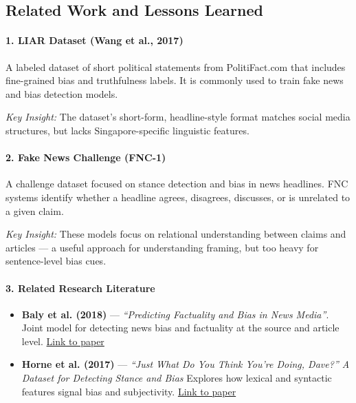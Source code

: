 \documentclass[12pt]{article}
\begin{document}
\subsection*{Related Work and Lessons Learned}

\paragraph{1. LIAR Dataset (Wang et al., 2017)}  
A labeled dataset of short political statements from PolitiFact.com that includes fine-grained bias and truthfulness labels. It is commonly used to train fake news and bias detection models.

\textit{Key Insight:} The dataset’s short-form, headline-style format matches social media structures, but lacks Singapore-specific linguistic features.

\paragraph{2. Fake News Challenge (FNC-1)}  
A challenge dataset focused on stance detection and bias in news headlines. FNC systems identify whether a headline agrees, disagrees, discusses, or is unrelated to a given claim.

\textit{Key Insight:} These models focus on relational understanding between claims and articles — a useful approach for understanding framing, but too heavy for sentence-level bias cues.

\paragraph{3. Related Research Literature}
\begin{itemize}
    \item \textbf{Baly et al. (2018)} — \textit{“Predicting Factuality and Bias in News Media”}.  
    Joint model for detecting news bias and factuality at the source and article level.  
    \href{https://aclanthology.org/N18-2103/}{Link to paper}

    \item \textbf{Horne et al. (2017)} — \textit{“Just What Do You Think You’re Doing, Dave?” A Dataset for Detecting Stance and Bias}  
    Explores how lexical and syntactic features signal bias and subjectivity.  
    \href{https://arxiv.org/abs/1703.09398}{Link to paper}
\end{itemize}

\newpage

\end{document}
